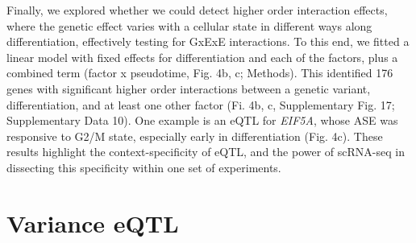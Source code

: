 Finally, we explored whether we could detect higher order interaction effects, where the genetic effect varies with a cellular state in different ways along differentiation, effectively testing for GxExE interactions. 
To this end, we fitted a linear model with fixed effects for differentiation and each of the factors, plus a combined term (factor x pseudotime, Fig. 4b, c; Methods). 
This identified 176 genes with significant higher order interactions between a genetic variant, differentiation, and at least one other factor (Fi. 4b, c, Supplementary Fig. 17; Supplementary Data 10). 
One example is an eQTL for \textit{EIF5A}, whose ASE was responsive to G2/M state, especially early in differentiation (Fig. 4c). 
These results highlight the context-specificity of eQTL, and the power of scRNA-seq in dissecting this specificity within one set of experiments.

\newpage

\section{Variance eQTL}